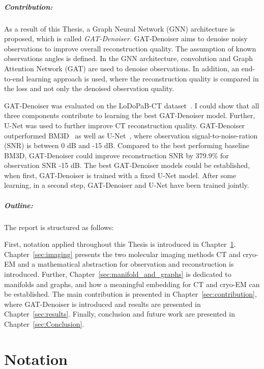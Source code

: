 \paragraph{Contribution:}

As a result of this Thesis, a Graph Neural Network (GNN) architecture is proposed, which is called \textit{GAT-Denoiser}.
GAT-Denoiser aims to denoise noisy observations to improve overall reconstruction quality.
The assumption of known observations angles is defined.
In the GNN architecture, convolution and Graph Attention Network (GAT) are used to denoise observations.
In addition, an end-to-end learning approach is used, where the reconstruction quality is compared in the loss
and not only the denoised observation quality.

GAT-Denoiser was evaluated on the LoDoPaB-CT dataset~\cite{lodopab-dataset}.
I could show that all three components contribute to learning the best GAT-Denoiser model.
Further, U-Net\cite{unet-tomography} was used to further improve CT reconstruction quality.
GAT-Denoiser outperformed BM3D~\cite{bm3d} as well as U-Net~\cite{unet-tomography},
where observation signal-to-noise-ration (SNR) is between 0 dB and -15 dB.
Compared to the best performing baseline BM3D, GAT-Denoiser could improve reconstruction SNR 
by 379.9\% for observation SNR -15 dB.
The best GAT-Denoiser models could be established, when first, GAT-Denoiser is trained with a fixed U-Net model.
After some learning, in a second step, GAT-Denoiser and U-Net have been trained jointly.


\paragraph{Outline:}

The report is structured as follows: 

First, notation applied throughout this Thesis is introduced in Chapter~\ref{sec:notation}.
 Chapter~\ref{sec:imaging} presents the two molecular imaging methods
CT and cryo-EM and a mathematical abstraction for observation and reconstruction is introduced.
Further, Chapter~\ref{sec:manifold_and_graphs} is dedicated to manifolds and graphs,
and how a meaningful embedding for CT and cryo-EM can be established. 
The main contribution is presented in Chapter~\ref{sec:contribution}, 
where GAT-Denoiser is introduced and results are presented in Chapter~\ref{sec:results}.
Finally, conclusion and future work are presented in Chapter~\ref{sec:Conclusion}.

\chapter{Notation}
\label{sec:notation}

